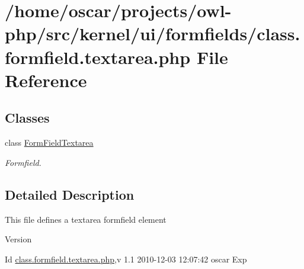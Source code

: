 \section{/home/oscar/projects/owl-\/php/src/kernel/ui/formfields/class.formfield.textarea.php File Reference}
\label{class_8formfield_8textarea_8php}
\subsection*{Classes}
\begin{DoxyCompactItemize}
\item 
class \hyperlink{classFormFieldTextarea}{FormFieldTextarea}
\begin{DoxyCompactList}\small\item\em Formfield. \item\end{DoxyCompactList}\end{DoxyCompactItemize}


\subsection{Detailed Description}
This file defines a textarea formfield element \begin{DoxyVersion}{Version}

\end{DoxyVersion}
\begin{DoxyParagraph}{Id}
\hyperlink{class_8formfield_8textarea_8php}{class.formfield.textarea.php},v 1.1 2010-\/12-\/03 12:07:42 oscar Exp 
\end{DoxyParagraph}
